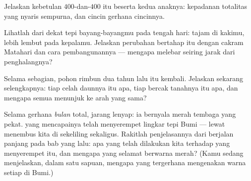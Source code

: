 \begin{exercise}[$\star\star$]\label{exo:g7:shadows-eclipses:9}
Jelaskan kebetulan $400$-dan-$400$ itu beserta kedua anaknya:
kepadanan totalitas yang nyaris sempurna, dan cincin gerhana
cincinnya.
\end{exercise}

\begin{exercise}[$\star\star$]\label{exo:g7:shadows-eclipses:10}
Lihatlah dari dekat tepi bayang-bayangmu pada tengah hari: tajam di
kakimu, lebih lembut pada  kepalamu. Jelaskan perubahan
bertahap itu dengan cakram Matahari dan cara pembangunannya --- mengapa
 melebar seiring jarak dari penghalangnya?
\end{exercise}

\begin{exercise}[$\star\star$]\label{exo:g7:shadows-eclipses:11}
Selama  sebagian,  pohon rimbun dua tahun lalu
itu kembali. Jelaskan sekarang selengkapnya: tiap celah daunnya itu
apa, tiap bercak tanahnya itu apa, dan mengapa semua  menunjuk
ke arah yang sama?
\end{exercise}

\begin{exercise}[$\star\star\star$]\label{exo:g7:shadows-eclipses:12}
Selama gerhana \emph{bulan} total,  jarang lenyap: ia bernyala
merah tembaga yang pekat.  yang mencapainya telah menyerempet
lingkar tepi Bumi --- lewat menembus   kita di
sekeliling  sekaligus. Rakitlah penjelasannya dari 
berjalan panjang pada bab yang lalu: apa yang telah dilakukan 
kita terhadap  yang menyerempet itu, dan mengapa  yang
selamat berwarna merah? (Kamu sedang menjelaskan, dalam satu sapuan,
mengapa  yang tergerhana mengenakan warna setiap  di Bumi.)
\end{exercise}

